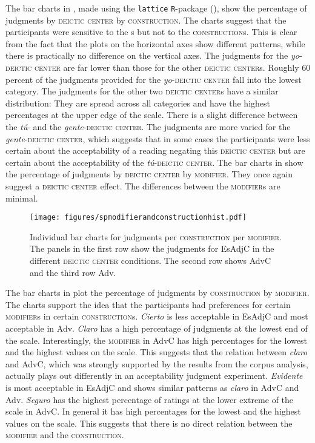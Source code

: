 The bar charts in , made using the  \verb|lattice| \verb|R|-package (\citealt{Sarkar2021}),  show the percentage of judgments by \textsc{deictic center} by \textsc{construction}. The charts suggest that the participants were sensitive to the  \textsc{}s but not to the \textsc{construction}s. This is clear from the fact that the plots on the horizontal axes show different patterns, while there is practically no difference on the vertical axes. The judgments for the \textit{yo}-\textsc{deictic center} are far lower than those for the other \textsc{deictic center}s. Roughly 60 percent of the judgments provided for the \textit{yo}-\textsc{deictic center} fall into the lowest category. The judgments for the other two \textsc{deictic center}s  have a similar distribution: They are spread across all categories and have the highest percentages at the upper edge of the scale. There is a slight difference between the \textit{tú}- and the \textit{gente}-\textsc{deictic center}. The judgments are more varied for the \textit{gente}-\textsc{deictic center}, which suggests that in some cases the participants were less certain about the acceptability of a reading negating this \textsc{deictic center} but are certain about the acceptability of the \textit{tú}-\textsc{deictic center}.  The bar charts in  show the percentage of judgments by \textsc{deictic center} by \textsc{modifier}. They once again suggest  a \textsc{deictic center} effect. The differences between the \textsc{modifier}s are minimal.

\begin{figure}[p]
	\centering
	\texttt{[image: figures/spmodifierandconstructionhist.pdf]}
	\caption{Individual bar charts for judgments per \textsc{construction} per \textsc{modifier}. The panels in the first row show the judgments for EsAdjC in the different \textsc{deictic center} conditions. The second row shows AdvC and the third row Adv.\label{fig:spbarchart}}
\end{figure}

The bar charts in  plot the percentage of judgments by \textsc{construction} by \textsc{modifier}. The charts support the idea that the participants had preferences for certain \textsc{modifier}s in  certain \textsc{construction}s. \textit{Cierto} is less acceptable in EsAdjC and most acceptable in Adv. \textit{Claro} has a high percentage of judgments at the lowest end of the scale. Interestingly, the \textsc{modifier} in AdvC has high percentages for the lowest and the highest values on the scale. This suggests that the relation between \textit{claro} and AdvC, which was strongly supported by the results from the corpus analysis, actually plays out differently in an acceptability judgment experiment.  \textit{Evidente} is most acceptable in EsAdjC and shows similar  patterns as \textit{claro} in AdvC and Adv. \textit{Seguro} has the highest percentage of  ratings at the lower extreme of the scale  in AdvC. In general it has high percentages for the lowest and the highest values on the scale. This suggests that there is no direct relation between the  \textsc{modifier} and the \textsc{construction}. 

